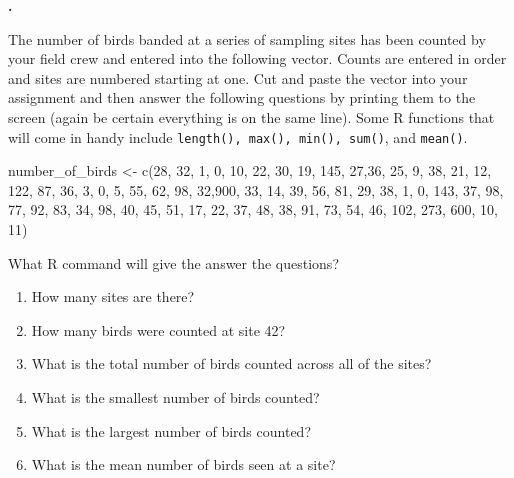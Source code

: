 \documentclass[11pt]{amsart}
\renewcommand{\(}{\left(}
\renewcommand{\)}{\right)}
\newcounter{CounterQ}
\newenvironment{q}{%
	\refstepcounter{CounterQ}
	\noindent\textbf{\Large{\theCounterQ}.}
}{
	\vspace{2ex}
}
\begin{document}

\begin{q}
  The number of birds banded at a series of sampling sites has been
  counted by your field crew and entered into the following
  vector. Counts are entered in order and sites are numbered starting
  at one. Cut and paste the vector into your assignment and then
  answer the following questions by printing them to the screen (again
  be certain everything is on the same line). Some
  R functions that will come in handy include \texttt{length(), max(), min(),
  sum()}, and \texttt{mean()}.

\begin{rcode}
number_of_birds <- c(28, 32, 1, 0, 10, 22, 30, 19, 145, 27,36, 25, 9, 38, 21, 12, 122, 87, 36, 3, 0, 5, 55, 62, 98, 32,900, 33, 14, 39, 56, 81, 29, 38, 1, 0, 143, 37, 98, 77, 92, 83, 34, 98, 40, 45, 51, 17, 22, 37, 48, 38, 91, 73, 54, 46, 102, 273, 600, 10, 11)
\end{rcode}

What R command will give the answer the questions?
  \begin{enumerate}
  \item How many sites are there?   
  \item How many birds were counted at site 42?   
  \item What is the total number of birds counted across all of the
    sites?   
  \item What is the smallest number of birds counted?   
  \item What is the largest number of birds counted?    
  \item What is the mean number of birds seen at a site?   
  \end{enumerate} 
\end{q} 

\end{document}
